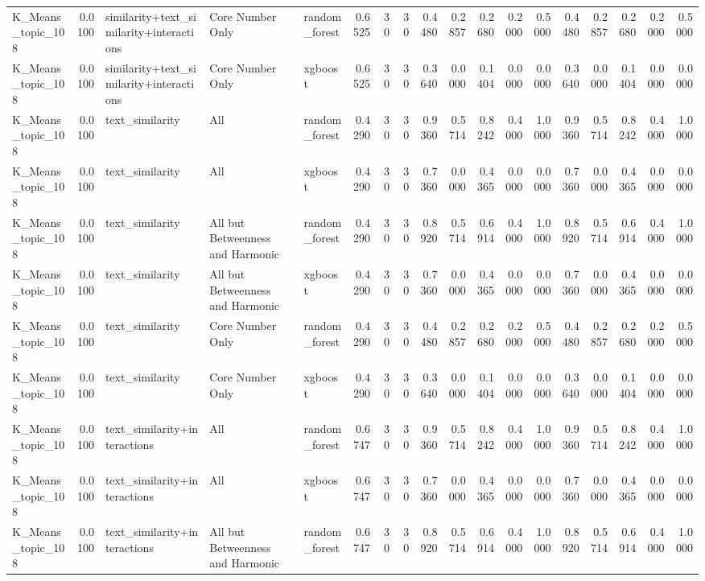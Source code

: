 \begin{tabular}{lrlllrrrrrrrrrrrrr}
K_Means_topic_108 & 0.0100 & similarity+text_similarity+interactions & Core Number Only & random_forest & 0.6525 & 30 & 30 & 0.4480 & 0.2857 & 0.2680 & 0.2000 & 0.5000 & 0.4480 & 0.2857 & 0.2680 & 0.2000 & 0.5000 \\
K_Means_topic_108 & 0.0100 & similarity+text_similarity+interactions & Core Number Only & xgboost & 0.6525 & 30 & 30 & 0.3640 & 0.0000 & 0.1404 & 0.0000 & 0.0000 & 0.3640 & 0.0000 & 0.1404 & 0.0000 & 0.0000 \\
K_Means_topic_108 & 0.0100 & text_similarity & All & random_forest & 0.4290 & 30 & 30 & 0.9360 & 0.5714 & 0.8242 & 0.4000 & 1.0000 & 0.9360 & 0.5714 & 0.8242 & 0.4000 & 1.0000 \\
K_Means_topic_108 & 0.0100 & text_similarity & All & xgboost & 0.4290 & 30 & 30 & 0.7360 & 0.0000 & 0.4365 & 0.0000 & 0.0000 & 0.7360 & 0.0000 & 0.4365 & 0.0000 & 0.0000 \\
K_Means_topic_108 & 0.0100 & text_similarity & All but Betweenness and Harmonic & random_forest & 0.4290 & 30 & 30 & 0.8920 & 0.5714 & 0.6914 & 0.4000 & 1.0000 & 0.8920 & 0.5714 & 0.6914 & 0.4000 & 1.0000 \\
K_Means_topic_108 & 0.0100 & text_similarity & All but Betweenness and Harmonic & xgboost & 0.4290 & 30 & 30 & 0.7360 & 0.0000 & 0.4365 & 0.0000 & 0.0000 & 0.7360 & 0.0000 & 0.4365 & 0.0000 & 0.0000 \\
K_Means_topic_108 & 0.0100 & text_similarity & Core Number Only & random_forest & 0.4290 & 30 & 30 & 0.4480 & 0.2857 & 0.2680 & 0.2000 & 0.5000 & 0.4480 & 0.2857 & 0.2680 & 0.2000 & 0.5000 \\
K_Means_topic_108 & 0.0100 & text_similarity & Core Number Only & xgboost & 0.4290 & 30 & 30 & 0.3640 & 0.0000 & 0.1404 & 0.0000 & 0.0000 & 0.3640 & 0.0000 & 0.1404 & 0.0000 & 0.0000 \\
K_Means_topic_108 & 0.0100 & text_similarity+interactions & All & random_forest & 0.6747 & 30 & 30 & 0.9360 & 0.5714 & 0.8242 & 0.4000 & 1.0000 & 0.9360 & 0.5714 & 0.8242 & 0.4000 & 1.0000 \\
K_Means_topic_108 & 0.0100 & text_similarity+interactions & All & xgboost & 0.6747 & 30 & 30 & 0.7360 & 0.0000 & 0.4365 & 0.0000 & 0.0000 & 0.7360 & 0.0000 & 0.4365 & 0.0000 & 0.0000 \\
K_Means_topic_108 & 0.0100 & text_similarity+interactions & All but Betweenness and Harmonic & random_forest & 0.6747 & 30 & 30 & 0.8920 & 0.5714 & 0.6914 & 0.4000 & 1.0000 & 0.8920 & 0.5714 & 0.6914 & 0.4000 & 1.0000 \\

\end{tabular}
